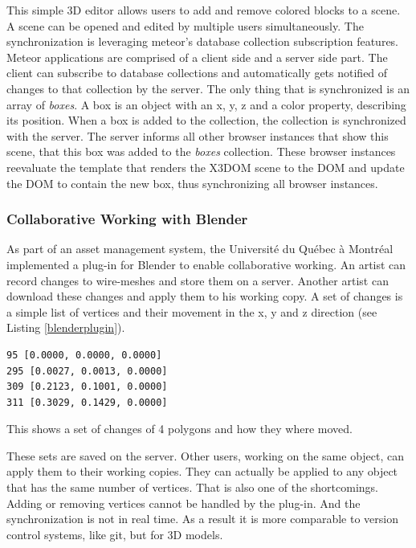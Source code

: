 This simple \gls{3D} editor allows users to add and remove colored blocks to a
scene. A scene can be opened and edited by multiple users simultaneously. The synchronization is leveraging meteor's database collection
subscription features. Meteor applications are comprised of a client side and a
server side part. The client can subscribe to database collections and
automatically gets notified of changes to that collection by the server. The only
thing that is synchronized is an array of \emph{boxes}. A box is an
object with an x, y, z and a color property, describing its position. When a box is
added to the collection, the collection is synchronized with the server. The
server informs all other browser instances that show this scene, that this box was added to the \emph{boxes} collection.
These browser instances reevaluate the template that renders the X3DOM scene to
the \gls{DOM} and update the \gls{DOM} to contain the new box, thus synchronizing
all browser instances. \cite{3dmeteor}

\subsubsection{Collaborative Working with Blender}
\label{blender-plugin}

As part of an asset management system, the Université du Québec à
Montréal implemented a plug-in for Blender to enable collaborative working. An
artist can record changes to wire-meshes and store them on a server.
Another artist can download these changes and apply them to his working
copy. A set of changes is a simple list of vertices and their movement in the
x, y and z direction (see Listing \ref{blenderplugin}). \cite{LCR07}

\begin{listing}
  \begin{verbatim}
95 [0.0000, 0.0000, 0.0000]
295 [0.0027, 0.0013, 0.0000]
309 [0.2123, 0.1001, 0.0000]
311 [0.3029, 0.1429, 0.0000]
  \end{verbatim}
  \caption{This shows a set of changes of 4 polygons and how they where moved.}
  \label{blenderplugin}
\end{listing}

These sets are saved on the server. Other users, working on the same
object, can apply them to their working copies. They can actually be applied
to any object that has the same number of vertices. That is also one of the
shortcomings. Adding or removing vertices cannot be handled by the
plug-in. And the synchronization is not in real time. As a result it is more comparable to version
control systems, like \gls{git}, but for \gls{3D} models.

